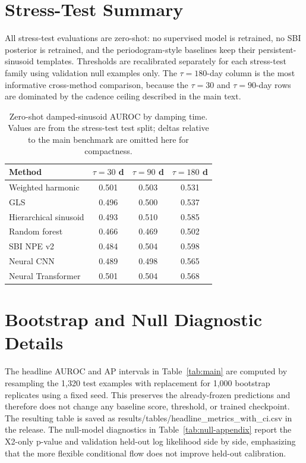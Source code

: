 \documentclass{article}
\begin{document}
\section{Stress-Test Summary}

All stress-test evaluations are zero-shot: no supervised model is retrained, no SBI posterior is retrained, and the periodogram-style baselines keep their persistent-sinusoid templates.  Thresholds are recalibrated separately for each stress-test family using validation null examples only.  The \(\tau=180\)-day column is the most informative cross-method comparison, because the \(\tau=30\) and \(\tau=90\)-day rows are dominated by the cadence ceiling described in the main text.

\begin{table}[h!]
  \centering
  \scriptsize
  \setlength{\tabcolsep}{3pt}
  \caption{Zero-shot damped-sinusoid AUROC by damping time.  Values are from the stress-test test split; deltas relative to the main benchmark are omitted here for compactness.}
  \begin{tabular}{lccc}
    \toprule
    Method & \(\tau=30\) d & \(\tau=90\) d & \(\tau=180\) d \\
    \midrule
    Weighted harmonic & 0.501 & 0.503 & 0.531 \\
    GLS & 0.496 & 0.500 & 0.537 \\
    Hierarchical sinusoid & 0.493 & 0.510 & 0.585 \\
    Random forest & 0.466 & 0.469 & 0.502 \\
    SBI NPE v2 & 0.484 & 0.504 & 0.598 \\
    Neural CNN & 0.489 & 0.498 & 0.565 \\
    Neural Transformer & 0.501 & 0.504 & 0.568 \\
    \bottomrule
  \end{tabular}
\end{table}

\section{Bootstrap and Null Diagnostic Details}

The headline AUROC and AP intervals in Table~\ref{tab:main} are computed by resampling the 1,320 test examples with replacement for 1,000 bootstrap replicates using a fixed seed.  This preserves the already-frozen predictions and therefore does not change any baseline score, threshold, or trained checkpoint.  The resulting table is saved as results/tables/headline\_metrics\_with\_ci.csv in the release.  The null-model diagnostics in Table~\ref{tab:null-appendix} report the X2-only p-value and validation held-out log likelihood side by side, emphasizing that the more flexible conditional flow does not improve held-out calibration.
\end{document}
